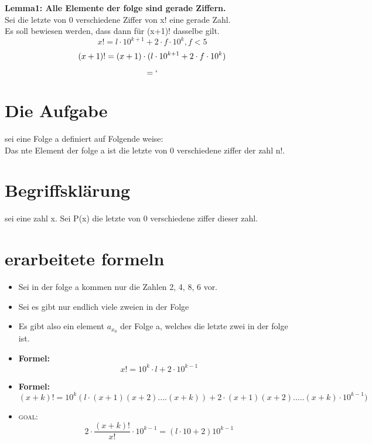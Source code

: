 \documentclass[12pt, letterpaper]{article}
\begin{document}
\textbf{Lemma1: Alle Elemente der folge sind gerade Ziffern.}\\

Sei die letzte von 0 verschiedene Ziffer von x! eine gerade Zahl.
\\Es soll bewiesen werden, dass dann für (x+1)! dasselbe gilt.\\
\[  
  x! = l\cdot 10^{k+1} +2\cdot f\cdot  10^{k}, f<5
\]
\[  
   (x+1)!\\
  = (x+1)\cdot  (l\cdot 10^{k+1} +2\cdot f\cdot  10^{k})

\]

\[  
  = `
\]

\newpage
\section{Die Aufgabe}
\label{sec:Die Aufgabe}
sei eine Folge a definiert auf Folgende weise: \\
Das nte Element der folge a ist die letzte von 0 verschiedene ziffer der zahl n!.



\section{Begriffsklärung}
sei eine zahl x. Sei P(x) die letzte von 0 verschiedene ziffer dieser zahl.\\


\section{erarbeitete formeln}
\label{sec:erarbeitete formeln}
\begin{itemize}
	\item Sei in der folge a kommen nur die Zahlen 2, 4, 8, 6 vor.
	\item Sei es gibt nur endlich viele zweien in der Folge
	\item Es gibt also ein element $a_{x_{0}}$ der Folge a, welches die letzte zwei in der folge ist.\\
	\item \textbf{Formel:}	\[	
		x! = 10^{k} \cdot  l + 2\cdot  10^{k-1}
	\]
	\item \textbf{Formel:}	\[	
		(x+k)! = 10^{k}(l\cdot (x+1)(x+2)....(x+k))+2\cdot (x+1)(x+2).....(x+k)\cdot 10^{k-1})
	\]
	\item \textsc{goal:}	\[	
			2\cdot \frac{(x+k)!}{x!}\cdot  10^{k-1} = (l\cdot 10 +2	)10^{k-1}
	\]

\end{itemize}
\end{document}
